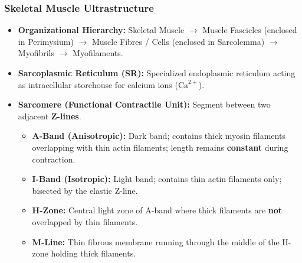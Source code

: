 \documentclass[11pt,a4paper]{article}
\begin{document}
\subsubsection{Skeletal Muscle Ultrastructure}
\begin{itemize}[leftmargin=1.5em, itemsep=2pt]
  \item \textbf{Organizational Hierarchy:} Skeletal Muscle $\to$ Muscle Fascicles (enclosed in Perimysium) $\to$ Muscle Fibres / Cells (enclosed in Sarcolemma) $\to$ Myofibrils $\to$ Myofilaments.
  \item \textbf{Sarcoplasmic Reticulum (SR):} Specialized endoplasmic reticulum acting as intracellular storehouse for calcium ions ($\text{Ca}^{2+}$).
  \item \textbf{Sarcomere (Functional Contractile Unit):} Segment between two adjacent \textbf{Z-lines}.
  \begin{itemize}[label=$\circ$]
    \item \textbf{A-Band (Anisotropic):} Dark band; contains thick myosin filaments overlapping with thin actin filaments; length remains \textbf{constant} during contraction.
    \item \textbf{I-Band (Isotropic):} Light band; contains thin actin filaments only; bisected by the elastic Z-line.
    \item \textbf{H-Zone:} Central light zone of A-band where thick filaments are \textbf{not} overlapped by thin filaments.
    \item \textbf{M-Line:} Thin fibrous membrane running through the middle of the H-zone holding thick filaments.
  \end{itemize}
\end{itemize}
\end{document}
